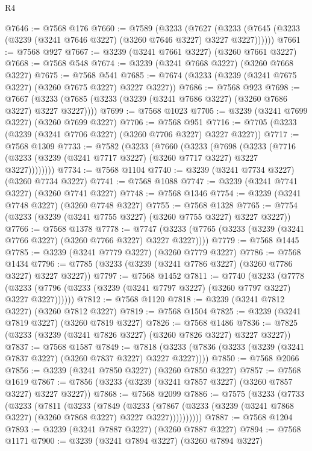 \begin{lexlean}{R4}
\begin{coremodule}
@7646 := @7568 @176
@7660 := @7589
    (@3233
      (@7627 (@3233 (@7645 (@3233 (@3239 (@3241 @7646 @3227) (@3260 @7646 @3227) @3227 @3227))))))
@7661 := @7568 @927
@7667 := @3239 (@3241 @7661 @3227) (@3260 @7661 @3227)
@7668 := @7568 @548
@7674 := @3239 (@3241 @7668 @3227) (@3260 @7668 @3227)
@7675 := @7568 @541
@7685 := @7674 (@3233 (@3239 (@3241 @7675 @3227) (@3260 @7675 @3227) @3227 @3227))
@7686 := @7568 @923
@7698 := @7667 (@3233 (@7685 (@3233 (@3239 (@3241 @7686 @3227) (@3260 @7686 @3227) @3227 @3227))))
@7699 := @7568 @1023
@7705 := @3239 (@3241 @7699 @3227) (@3260 @7699 @3227)
@7706 := @7568 @951
@7716 := @7705 (@3233 (@3239 (@3241 @7706 @3227) (@3260 @7706 @3227) @3227 @3227))
@7717 := @7568 @1309
@7733 := @7582
    (@3233
      (@7660
        (@3233
          (@7698
            (@3233 (@7716 (@3233 (@3239 (@3241 @7717 @3227) (@3260 @7717 @3227) @3227 @3227))))))))
@7734 := @7568 @1104
@7740 := @3239 (@3241 @7734 @3227) (@3260 @7734 @3227)
@7741 := @7568 @1088
@7747 := @3239 (@3241 @7741 @3227) (@3260 @7741 @3227)
@7748 := @7568 @1346
@7754 := @3239 (@3241 @7748 @3227) (@3260 @7748 @3227)
@7755 := @7568 @1328
@7765 := @7754 (@3233 (@3239 (@3241 @7755 @3227) (@3260 @7755 @3227) @3227 @3227))
@7766 := @7568 @1378
@7778 := @7747 (@3233 (@7765 (@3233 (@3239 (@3241 @7766 @3227) (@3260 @7766 @3227) @3227 @3227))))
@7779 := @7568 @1445
@7785 := @3239 (@3241 @7779 @3227) (@3260 @7779 @3227)
@7786 := @7568 @1434
@7796 := @7785 (@3233 (@3239 (@3241 @7786 @3227) (@3260 @7786 @3227) @3227 @3227))
@7797 := @7568 @1452
@7811 := @7740
    (@3233
      (@7778 (@3233 (@7796 (@3233 (@3239 (@3241 @7797 @3227) (@3260 @7797 @3227) @3227 @3227))))))
@7812 := @7568 @1120
@7818 := @3239 (@3241 @7812 @3227) (@3260 @7812 @3227)
@7819 := @7568 @1504
@7825 := @3239 (@3241 @7819 @3227) (@3260 @7819 @3227)
@7826 := @7568 @1486
@7836 := @7825 (@3233 (@3239 (@3241 @7826 @3227) (@3260 @7826 @3227) @3227 @3227))
@7837 := @7568 @1587
@7849 := @7818 (@3233 (@7836 (@3233 (@3239 (@3241 @7837 @3227) (@3260 @7837 @3227) @3227 @3227))))
@7850 := @7568 @2066
@7856 := @3239 (@3241 @7850 @3227) (@3260 @7850 @3227)
@7857 := @7568 @1619
@7867 := @7856 (@3233 (@3239 (@3241 @7857 @3227) (@3260 @7857 @3227) @3227 @3227))
@7868 := @7568 @2099
@7886 := @7575
    (@3233
      (@7733
        (@3233
          (@7811
            (@3233
              (@7849
                (@3233
                  (@7867 (@3233 (@3239 (@3241 @7868 @3227) (@3260 @7868 @3227) @3227 @3227))))))))))
@7887 := @7568 @1204
@7893 := @3239 (@3241 @7887 @3227) (@3260 @7887 @3227)
@7894 := @7568 @1171
@7900 := @3239 (@3241 @7894 @3227) (@3260 @7894 @3227)

\end{coremodule}
\end{lexlean}

